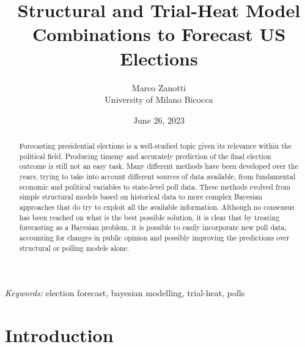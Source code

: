 \documentclass[
  12pt]{article}
\begin{document}
\def\spacingset#1{\renewcommand{\baselinestretch}%
{#1}\small\normalsize} \spacingset{1}



\date{June 26, 2023}
\title{\bf Structural and Trial-Heat Model Combinations to Forecast US
Elections}
\author{
Marco Zanotti\\
University of Milano Bicocca\\
}
\maketitle

\bigskip
\bigskip
\begin{abstract}
Forecasting presidential elections is a well-studied topic given its
relevance within the political field. Producing timemy and accurately
prediction of the final election outcome is still not an easy task. Many
different methods have been developed over the years, trying to take
into account different sources of data available, from fundamental
economic and political variables to state-level poll data. These methods
evolved from simple structural models based on historical data to more
complex Bayesian approaches that do try to exploit all the available
information. Although no consensus has been reached on what is the best
possible solution, it is clear that by treating forecasting as a
Bayesian problem, it is possible to easily incorporate new poll data,
accounting for changes in public opinion and possibly improving the
predictions over structural or polling models alone.
\end{abstract}

\noindent%
{\it Keywords:} election forecast, bayesian modelling, trial-heat, polls
\vfill

\newpage
\spacingset{1.9} %
\ifdefined\Shaded\renewenvironment{Shaded}{\begin{tcolorbox}[sharp corners, breakable, enhanced, borderline west={3pt}{0pt}{shadecolor}, boxrule=0pt, interior hidden, frame hidden]}{\end{tcolorbox}}\fi

\hypertarget{sec-intro}{%
\section{Introduction}\label{sec-intro}}
\end{document}
